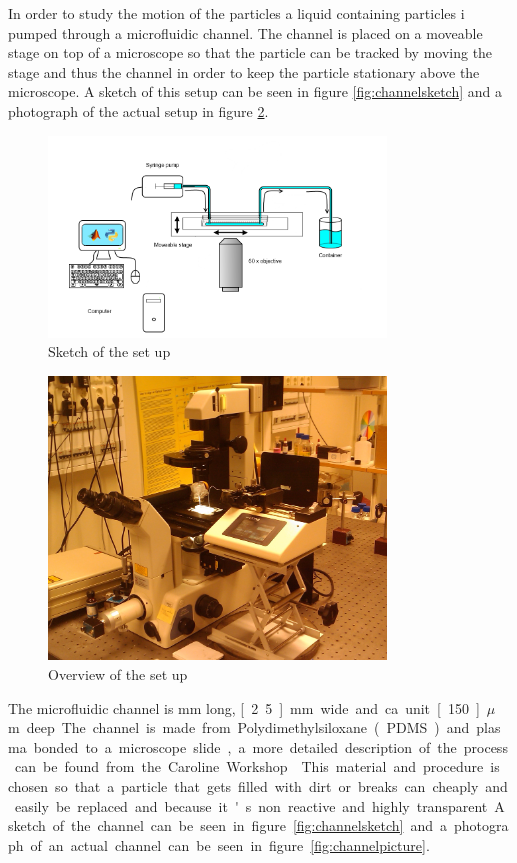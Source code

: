 In order to study the motion of the particles a liquid containing particles i pumped through a microfluidic channel. The channel is placed on a moveable stage on top of a microscope so that the particle can be tracked by moving the stage and thus the channel in order to keep the particle stationary above the microscope. A sketch of this setup can be seen in figure \ref{fig:channelsketch} and a photograph of the actual setup in figure \ref{fig:setuppicture}. 


\begin{figure}[H]
\centering
\includegraphics[width=0.8\textwidth]{figures/method/setupsketch.png}
\caption{Sketch of the set up}\label{fig:setupsketch}
\end{figure}

\begin{figure}[H]
\centering
\includegraphics[width=0.8\textwidth]{figures/method/ExperimentalOverview.jpg}
\caption{Overview of the set up}\label{fig:setuppicture}
\end{figure}


The microfluidic channel is \unit[40]{mm} long, \unit[2.5]{mm} wide and ca unit[150]{$\mu$m} deep. The channel is made from Polydimethylsiloxane (PDMS) and plasma bonded to a microscope slide, a more detailed description of the process can be found from the Caroline Workshop \cite{PDMS}. This material and procedure is chosen so that a particle that gets filled with dirt or breaks can cheaply and easily be replaced and because it's non reactive and highly transparent. A sketch of the channel can be seen in figure \ref{fig:channelsketch} and a photograph of an actual channel can be seen in figure \ref{fig:channelpicture}. 

